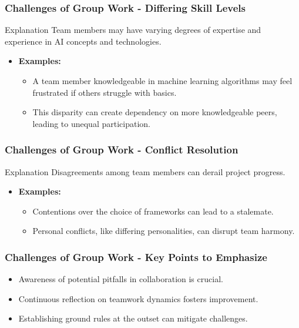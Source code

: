 \documentclass[aspectratio=169]{beamer}
\begin{document}
\begin{frame}[fragile]
    \frametitle{Challenges of Group Work - Differing Skill Levels}
    \begin{block}{Explanation}
        Team members may have varying degrees of expertise and experience in AI concepts and technologies.
    \end{block}
    \begin{itemize}
        \item \textbf{Examples:}
        \begin{itemize}
            \item A team member knowledgeable in machine learning algorithms may feel frustrated if others struggle with basics.
            \item This disparity can create dependency on more knowledgeable peers, leading to unequal participation.
        \end{itemize}
    \end{itemize}
\end{frame}

\begin{frame}[fragile]
    \frametitle{Challenges of Group Work - Conflict Resolution}
    \begin{block}{Explanation}
        Disagreements among team members can derail project progress.
    \end{block}
    \begin{itemize}
        \item \textbf{Examples:}
        \begin{itemize}
            \item Contentions over the choice of frameworks can lead to a stalemate.
            \item Personal conflicts, like differing personalities, can disrupt team harmony.
        \end{itemize}
    \end{itemize}
\end{frame}

\begin{frame}[fragile]
    \frametitle{Challenges of Group Work - Key Points to Emphasize}
    \begin{itemize}
        \item Awareness of potential pitfalls in collaboration is crucial.
        \item Continuous reflection on teamwork dynamics fosters improvement.
        \item Establishing ground rules at the outset can mitigate challenges.
    \end{itemize}
\end{frame}
\end{document}
